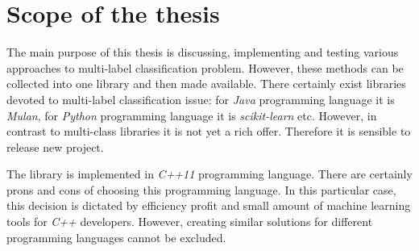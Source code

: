 \section{Scope of the thesis}

The main purpose of this thesis is discussing, implementing and testing various approaches to multi-label classification problem. However, these methods can be collected into one library and then made available. There certainly exist libraries devoted to multi-label classification issue: for \textit{Java} programming language it is \textit{Mulan}, for \textit{Python} programming language it is \textit{scikit-learn} etc. However, in contrast to multi-class libraries it is not yet a rich offer. Therefore it is sensible to release new project.    

The library is implemented in \textit{C++11} programming language. There are certainly prons and cons of choosing this programming language. In this particular case, this decision is dictated by efficiency profit and small amount of machine learning tools for \textit{C++} developers. However, creating similar solutions for different programming languages cannot be excluded.
